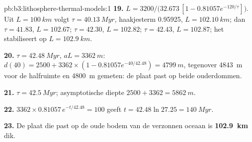 \begin{solution}{pb:b3:lithosphere-thermal-models:1}
\textbf{19.} $L = 3200/\bigl(32.673\,[1 - 0.81057e^{-120/\tau}]\bigr)$. Uit
$L = \qty{100}{km}$ volgt $\tau = \qty{40.13}{Myr}$, haakjesterm 0.95925, $L =
\qty{102.10}{km}$; dan $\tau = 41.83$, $L = 102.67$; $\tau = 42.30$, $L =
102.82$; $\tau = 42.43$, $L = 102.87$; het stabiliseert op $L = \qty{102.9}{km}$.

\textbf{20.} $\tau = \qty{42.48}{Myr}$, $aL = \qty{3362}{m}$: $d(40) = 2500 +
3362\times(1 - 0.81057e^{-40/42.48}) = \qty{4799}{m}$, tegenover \qty{4843}{m}
voor de halfruimte en \qty{4800}{m} gemeten: de plaat past op beide ouderdommen.

\textbf{21.} $\tau = \qty{42.5}{Myr}$; asymptotische diepte $2500 + 3362 =
\qty{5862}{m}$.

\textbf{22.} $3362\times0.81057\,e^{-t/42.48} = 100$ geeft $t = 42.48\ln27.25 =
\qty{140}{Myr}$.

\textbf{23.} De plaat die past op de oude bodem van de verzonnen oceaan is
\textbf{\qty[text-series-to-math=true]{102.9}{km}} dik.
\end{solution}

